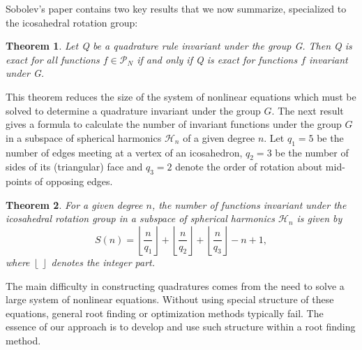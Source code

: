 \documentclass[landscape,a0b,final]{a0poster}
\newtheorem{thm}{Theorem}
\newcommand{\Har}{{\mathcal H}}
\newcommand{\HH}{{\mathcal P}}
\newenvironment{poster}{
  \begin{center}
  \begin{minipage}[c]{0.98\textwidth}
}{
  \end{minipage} 
  \end{center}
}
\newcommand{\pbox}[4]{
\psshadowbox[#3]{
\begin{minipage}[t][#2][t]{#1}
#4
\end{minipage}
}}
\begin{document}
\begin{poster}
\begin{multicols}{3}
Sobolev's paper \cite{SOBOLEV-1962} contains two key results that
we now summarize, specialized to the icosahedral rotation group:
\begin{thm}
\label{thm:invQ}Let Q be a quadrature rule invariant under the group
G. Then Q is exact for all functions $f\in\HH_{N}$ if and only if
Q is exact for functions $f$ invariant under G. 
\end{thm}
This theorem reduces the size of the system of nonlinear
equations which must be solved to determine a quadrature invariant
under the group $G$. The next result gives a formula to calculate
the number of invariant functions under the group $G$ in a subspace
of spherical harmonics $\Har_{n}$ of a given degree $n$. Let $q_{1}=5$
be the number of edges meeting at a vertex of an icosahedron, $q_{2}=3$
be the number of sides of its (triangular) face and $q_{3}=2$ denote
the order of rotation about mid-points of opposing edges. 
\begin{thm}
\label{thm:Snumbers}For a given degree $n$, the number of functions
invariant under the icosahedral rotation group in a subspace of spherical
harmonics $\Har_{n}$ is given by
\[
S(n)=\left\lfloor \frac{n}{q_{1}}\right\rfloor +\left\lfloor \frac{n}{q_{2}}\right\rfloor +\left\lfloor \frac{n}{q_{3}}\right\rfloor -n+1,
\]
where $\left\lfloor \,\right\rfloor$ denotes the integer part.
\end{thm}

\vspace{0.25cm}
\begin{center}\pbox{0.8\columnwidth}{}{linewidth=2mm,framearc=0.1,linecolor=lightblue,fillstyle=gradient,gradangle=0,gradbegin=white,gradend=whiteblue,gradmidpoint=1.0,framesep=1em}{\begin{center}Quadratures for the sphere\end{center}}\end{center}
\vspace{0.25cm}

The main difficulty in constructing quadratures comes from the need
to solve a large system of nonlinear equations. Without using special
structure of these equations, general root finding or optimization
methods typically fail. The essence of our approach is to develop
and use such structure within a root finding method.


\end{multicols}
\end{poster}
\end{document}
